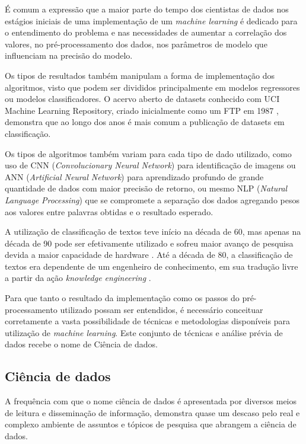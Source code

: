 \documentclass[conference]{IEEEtran}
\begin{document}
É comum a expressão que a maior parte do tempo dos cientistas de dados nos estágios iniciais de uma implementação de um \textit{machine learning} é dedicado para o entendimento do problema e nas necessidades de aumentar a correlação dos valores, no pré-processamento dos dados, nos parâmetros de modelo que influenciam na precisão do modelo.

Os tipos de resultados também manipulam a forma de implementação dos algoritmos, visto que podem ser divididos principalmente em modelos regressores ou modelos classificadores. O acervo aberto de datasets conhecido com UCI Machine Learning Repository, criado inicialmente como um FTP em 1987 \cite{uciabout}, demonstra que ao longo dos anos é mais comum a publicação de datasets em classificação.

Os tipos de algoritmos também variam para cada tipo de dado utilizado, como uso de CNN (\textit{Convolucionary Neural Network}) para identificação de imagens ou ANN (\textit{Artificial Neural Network}) para aprendizado profundo de grande quantidade de dados com maior precisão de retorno, ou mesmo NLP (\textit{Natural Language Processing}) que se compromete a separação dos dados agregando pesos aos valores entre palavras obtidas e o resultado esperado.

A utilização de classificação de textos teve início na década de 60, mas apenas na década de 90 pode ser efetivamente utilizado e sofreu maior avanço de pesquisa devida a maior capacidade de hardware \cite{Sebastiani:2002:MLA:505282.505283}. Até a década de 80, a classificação de textos era dependente de um engenheiro de conhecimento, em sua tradução livre a partir da ação \textit{knowledge engineering} \cite{Sebastiani:2002:MLA:505282.505283}. 

Para que tanto o resultado da implementação como os passos do pré-processamento utilizado possam ser entendidos, é necessário conceituar corretamente a vasta possibilidade de técnicas e metodologias disponíveis para utilização de \textit{machine learning}. Este conjunto de técnicas e análise prévia de dados recebe o nome de Ciência de dados.

\subsection{Ciência de dados}

A frequência com que o nome ciência de dados é apresentada por diversos meios de leitura e disseminação de informação, demonstra quase um descaso pelo real e complexo ambiente de assuntos e tópicos de pesquisa que abrangem a ciência de dados. 
\end{document}
